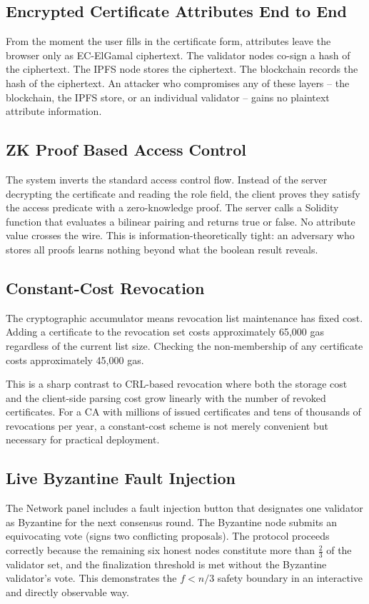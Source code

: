 \documentclass[12pt,a4paper]{article}
\begin{document}
\subsection{Encrypted Certificate Attributes End to End}
From the moment the user fills in the certificate form, attributes leave the browser only as EC-ElGamal ciphertext. The validator nodes co-sign a hash of the ciphertext. The IPFS node stores the ciphertext. The blockchain records the hash of the ciphertext. An attacker who compromises any of these layers -- the blockchain, the IPFS store, or an individual validator -- gains no plaintext attribute information.

\subsection{ZK Proof Based Access Control}
The system inverts the standard access control flow. Instead of the server decrypting the certificate and reading the role field, the client proves they satisfy the access predicate with a zero-knowledge proof. The server calls a Solidity function that evaluates a bilinear pairing and returns true or false. No attribute value crosses the wire. This is information-theoretically tight: an adversary who stores all proofs learns nothing beyond what the boolean result reveals.

\subsection{Constant-Cost Revocation}
The cryptographic accumulator means revocation list maintenance has fixed cost. Adding a certificate to the revocation set costs approximately 65,000 gas regardless of the current list size. Checking the non-membership of any certificate costs approximately 45,000 gas.

This is a sharp contrast to CRL-based revocation where both the storage cost and the client-side parsing cost grow linearly with the number of revoked certificates. For a CA with millions of issued certificates and tens of thousands of revocations per year, a constant-cost scheme is not merely convenient but necessary for practical deployment.

\subsection{Live Byzantine Fault Injection}
The Network panel includes a fault injection button that designates one validator as Byzantine for the next consensus round. The Byzantine node submits an equivocating vote (signs two conflicting proposals). The protocol proceeds correctly because the remaining six honest nodes constitute more than $\frac{2}{3}$ of the validator set, and the finalization threshold is met without the Byzantine validator's vote. This demonstrates the $f < n/3$ safety boundary in an interactive and directly observable way.
\end{document}
